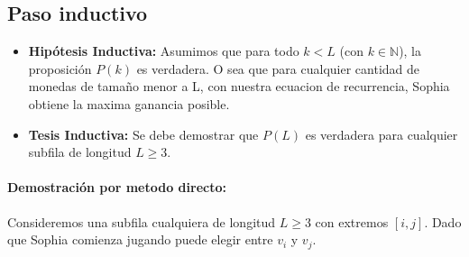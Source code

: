 \subsection{Paso inductivo}
\begin{itemize}
    \item \textbf{Hipótesis Inductiva:} Asumimos que para todo $k < L$ (con $k \in \mathbb{N}$), la proposición $P(k)$ es verdadera. O sea que para cualquier cantidad de monedas de tamaño menor a L, con nuestra ecuacion de recurrencia, Sophia obtiene la maxima ganancia posible.
    \item \textbf{Tesis Inductiva:} Se debe demostrar que $P(L)$ es verdadera para cualquier subfila de longitud $L \ge 3$.
\end{itemize}

\paragraph{Demostración por metodo directo:}
Consideremos una subfila cualquiera de longitud $L \ge 3$ con extremos $[i, j]$. Dado que Sophia comienza jugando puede elegir entre $v_i$ y $v_j$.


